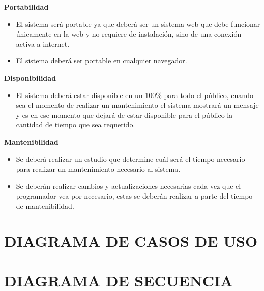\textbf{Portabilidad}
\begin{itemize}
    \item El sistema será portable ya que deberá ser un sistema web que debe funcionar únicamente en la web y no requiere de instalación, sino de una conexión activa a internet.
    \item El sistema deberá ser portable en cualquier navegador.
\end{itemize}

\textbf{Disponibilidad}
\begin{itemize}
    \item El sistema deberá estar disponible en un 100\% para todo el público, cuando sea el momento de realizar un mantenimiento el sistema mostrará un mensaje y es en ese momento que dejará de estar disponible para el público la cantidad de tiempo que sea requerido.
\end{itemize}

\textbf{Mantenibilidad}
\begin{itemize}
    \item Se deberá realizar un estudio que determine cuál será el tiempo necesario para realizar un mantenimiento necesario al sistema.
    \item Se deberán realizar cambios y actualizaciones necesarias cada vez que el programador vea por necesario, estas se deberán realizar a parte del tiempo de mantenibilidad.
\end{itemize}

\section{DIAGRAMA DE CASOS DE USO}

\section{DIAGRAMA DE SECUENCIA}
